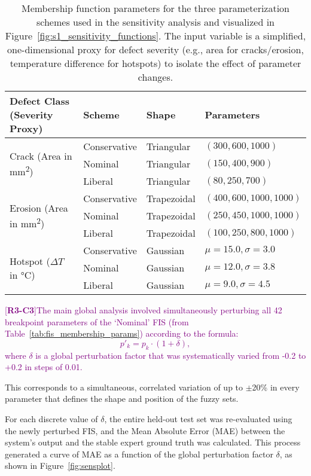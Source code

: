 \documentclass[energies,supfile,submit,pdftex,moreauthors]{Definitions/mdpi}
\newcommand{\revtag}[2]{[\textbf{R#1-C#2}]}
\newcommand{\Rthree}[1]{\textcolor{purple}{#1}}
\begin{document}
\begin{table}[!htb]
\caption{Membership function parameters for the three parameterization schemes used in the sensitivity analysis and visualized in Figure~\ref{fig:s1_sensitivity_functions}. The input variable is a simplified, one-dimensional proxy for defect severity (e.g., area for cracks/erosion, temperature difference for hotspots) to isolate the effect of parameter changes.}
\label{tab:sensitivity_membership_params}
\centering
\begin{tabularx}{\textwidth}{X l l l}
\toprule
\textbf{Defect Class (Severity Proxy)} & \textbf{Scheme} & \textbf{Shape} & \textbf{Parameters} \\
\midrule
\multirow{3}{*}{Crack (Area in \si{mm^2})} 
& Conservative & Triangular & $(300, 600, 1000)$ \\
& Nominal      & Triangular & $(150, 400, 900)$ \\
& Liberal      & Triangular & $(80, 250, 700)$ \\
\midrule
\multirow{3}{*}{Erosion (Area in \si{mm^2})} 
& Conservative & Trapezoidal & $(400, 600, 1000, 1000)$ \\
& Nominal      & Trapezoidal & $(250, 450, 1000, 1000)$ \\
& Liberal      & Trapezoidal & $(100, 250, 800, 1000)$ \\
\midrule
\multirow{3}{*}{Hotspot (\(\Delta T\) in \si{\celsius})}
& Conservative & Gaussian    & $\mu=15.0, \sigma=3.0$ \\
& Nominal      & Gaussian    & $\mu=12.0, \sigma=3.8$ \\
& Liberal      & Gaussian    & $\mu=9.0, \sigma=4.5$ \\
\bottomrule
\end{tabularx}
\end{table}

\Rthree{\revtag{3}{3}The main global analysis involved simultaneously perturbing all 42 breakpoint parameters of the `Nominal' FIS (from Table~\ref{tab:fis_membership_params}) according to the formula:
\begin{equation}
    p'_k = p_k \cdot (1 + \delta),
\end{equation}
where \(\delta\) is a global perturbation factor that was systematically varied from -0.2 to +0.2 in steps of 0.01.}

This corresponds to a simultaneous, correlated variation of up to \(\pm\)20\% in every parameter that defines the shape and position of the fuzzy sets.

For each discrete value of \(\delta\), the entire held-out test set was re-evaluated using the newly perturbed FIS, and the Mean Absolute Error (MAE) between the system's output and the stable expert ground truth was calculated. This process generated a curve of MAE as a function of the global perturbation factor \(\delta\), as shown in Figure~\ref{fig:sensplot}.
\end{document}
